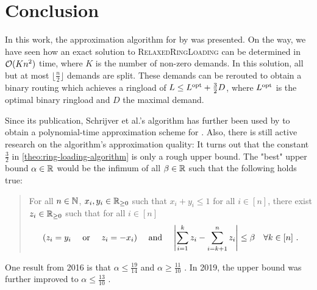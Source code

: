 \section{Conclusion}

In this work, the approximation algorithm for \RL by \citet{schrijver99} was presented.
On the way, we have seen how an exact solution to \textsc{RelaxedRingLoading} can be determined in $\mathcal{O}(K n^2)$ time, where $K$ is the number of non-zero demands.
In this solution, all but at most $\lfloor \frac{n}{2} \rfloor$ demands are split.
These demands can be rerouted to obtain a binary routing which achieves a ringload of $L \leq L^{\mathrm{opt}} + \frac{3}{2}D$, where $L^{\mathrm{opt}}$ is the optimal binary ringload and $D$ the maximal demand.

Since its publication, Schrijver et al.'s  algorithm has further been used by \citet{khanna97} to obtain a polynomial-time approximation scheme for \RL.
Also, there is still active research on the algorithm's approximation quality:
It turns out that the constant $\frac{3}{2}$ in \cref{theo:ring-loading-algorithm} is only a rough upper bound.
The "best" upper bound $\alpha \in \mathbb{R}$ would be the infimum of all $\beta \in \mathbb{R}$ such that the following holds true:
\begin{quote}
	For all $n \in \mathbb{N}$, $x_i, y_i \in \mathbb{R}_{\geq 0}$ such that $x_i + y_i \leq 1$ for all $i \in [n]$, there exist $z_i \in \mathbb{R}_{\geq 0}$ such that for all $i \in [n]$
	\begin{equation}
		(z_i = y_i \quad \text{ or } \quad z_i = -x_i) 
		\quad \text{ and } \quad \abs{\sum_{i=1}^k z_i - \sum_{i = k+1}^n z_i} \leq \beta \quad \forall k \in [n] \ .
	\end{equation}
\end{quote}
One result from 2016 is that $\alpha \leq \frac{19}{14}$ and $\alpha \geq \frac{11}{10}$ \cite{skutella16}.
In 2019, the upper bound was further improved to $\alpha \leq \frac{13}{10}$ \cite{daubel19}.